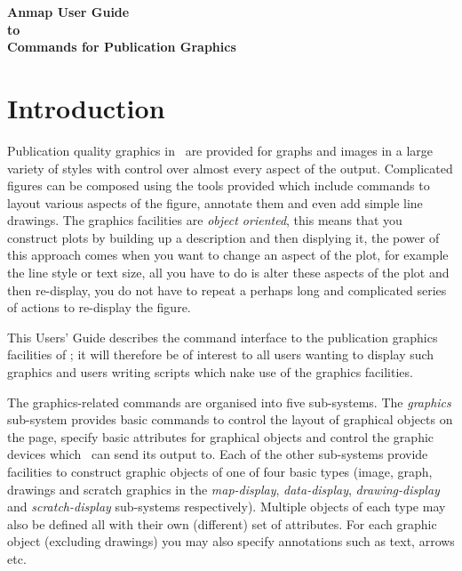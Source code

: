 

\begin{center}
\vspace*{4.0cm}
{\Large\bf Anmap User Guide} \\
\vspace{1.0cm}
{\large\bf to} \\
\vspace{1.0cm}
{\Large\bf Commands for Publication Graphics}
\end{center}

\newpage
\section{Introduction}

Publication quality graphics in \Anmap\ are provided for graphs
and images in a large variety of styles with control over almost
every aspect of the output.  Complicated figures can be composed
using the tools provided which include commands to layout various
aspects of the figure, annotate them and even add simple line
drawings.  The graphics facilities are {\em object oriented}, this
means that you construct plots by building up a description and
then displying it, the power of this approach comes when you want to
change an aspect of the plot, for example the line style or text size,
all you have to do is alter these aspects of the plot and then re-display,
you do not have to repeat a perhaps long and complicated series of
actions to  re-display the figure.

This Users' Guide describes the command interface to the publication
graphics facilities of \Anmap; it will therefore be of interest to
all users wanting to display such graphics and users writing scripts
which nake use of the graphics facilities.  

The graphics-related commands are organised into five sub-systems.
The {\em graphics} sub-system provides basic commands to control the
layout of graphical objects on the page, specify basic attributes for
graphical objects and control the graphic devices which \Anmap\ can send
its output to.  Each of the other sub-systems provide facilities to
construct graphic objects of one of four basic types (image, graph,
drawings and scratch graphics in the {\em map-display}, 
{\em data-display}, {\em drawing-display} and {\em scratch-display}
sub-systems respectively).  Multiple objects of each type may also be
defined all with their own (different) set of attributes.  For each
graphic object (excluding drawings) you may also specify annotations
such as text, arrows etc.

